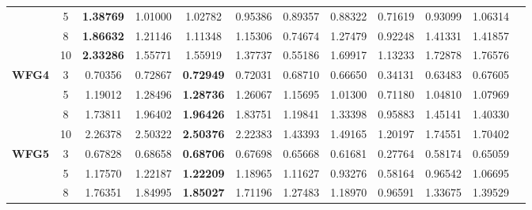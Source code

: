 \documentclass{sig-alternate}
\begin{document}
\begin{table}[!htb]
\begin{tabular}{|c|c|c|c|c|c|c|c|c|c|c|c|}
& 5          & \textbf{1.38769} & 1.01000           & 1.02782               & 0.95386          & 0.89357             & 0.88322             & 0.71619            & 0.93099              & 1.06314          \\ \cline{2-11} 
& 8          & \textbf{1.86632} & 1.21146           & 1.11348               & 1.15306          & 0.74674             & 1.27479             & 0.92248            & 1.41331              & 1.41857          \\ \cline{2-11} 
& 10         & \textbf{2.33286} & 1.55771           & 1.55919               & 1.37737          & 0.55186             & 1.69917             & 1.13233            & 1.72878              & 1.76576          \\ \hline
\multirow{4}{*}{\textbf{WFG4}}  & 3          & 0.70356          & 0.72867           & \textbf{0.72949}      & 0.72031          & 0.68710             & 0.66650             & 0.34131            & 0.63483              & 0.67605          \\ \cline{2-11} 
& 5          & 1.19012          & 1.28496           & \textbf{1.28736}      & 1.26067          & 1.15695             & 1.01300             & 0.71180            & 1.04810              & 1.07969          \\ \cline{2-11} 
& 8          & 1.73811          & 1.96402           & \textbf{1.96426}      & 1.83751          & 1.19841             & 1.33398             & 0.95883            & 1.45141              & 1.40330          \\ \cline{2-11} 
& 10         & 2.26378          & 2.50322           & \textbf{2.50376}      & 2.22383          & 1.43393             & 1.49165             & 1.20197            & 1.74551              & 1.70402          \\ \hline
\multirow{4}{*}{\textbf{WFG5}}  & 3          & 0.67828          & 0.68658           & \textbf{0.68706}      & 0.67698          & 0.65668             & 0.61681             & 0.27764            & 0.58174              & 0.65059          \\ \cline{2-11} 
& 5          & 1.17570          & 1.22187           & \textbf{1.22209}      & 1.18965          & 1.11627             & 0.93276             & 0.58164            & 0.96542              & 1.06695          \\ \cline{2-11} 
& 8          & 1.76351          & 1.84995           & \textbf{1.85027}      & 1.71196          & 1.27483             & 1.18970             & 0.96591            & 1.33675              & 1.39529          \\ \cline{2-11} 

\end{tabular}
\end{table}
\end{document}
